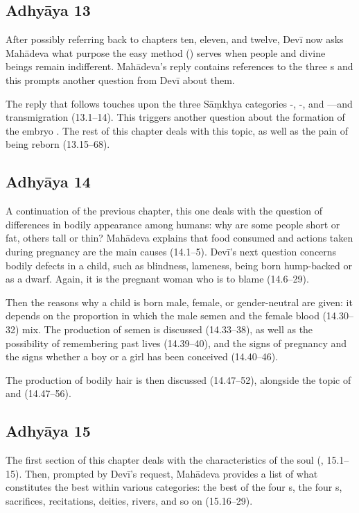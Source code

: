 \subsection*{Adhyāya 13}\label{contents_of_ch13}
After possibly referring back to chapters ten, eleven, and twelve, Devī now asks Mahādeva
what purpose the easy method () serves when people and divine beings remain indifferent.
Mahādeva's reply contains references to the three s and this prompts another question from Devī about them. 

The reply that follows touches upon the three Sāṃkhya categories -, -, and ---and
transmigration (13.1--14). This triggers another question about the formation of the embryo .
The rest of this chapter deals with this topic, as well as the pain of being reborn (13.15--68).

\subsection*{Adhyāya 14}\label{contents_of_ch14}
A continuation of the previous chapter, this one deals with the question of differences in bodily appearance 
among humans: why are some people short or fat, others tall or thin? Mahādeva explains that food consumed
and actions taken during pregnancy are the main causes (14.1--5). Devī's next question concerns bodily defects in 
a child, such as blindness, lameness, being born hump-backed or as a dwarf. Again, it is the pregnant woman who is
to blame (14.6--29). 

Then the reasons why a child is born male, female, or gender-neutral  are given:
it depends on the proportion in which the male semen and the female blood (14.30--32) mix.
The production of semen is discussed (14.33--38),
as well as the possibility of remembering past lives (14.39--40),
and the signs of pregnancy and the signs whether a boy or a girl has been conceived (14.40--46). 

The production of bodily hair is then discussed (14.47--52), alongside the topic of  and 
(14.47--56).

\subsection*{Adhyāya 15}\label{contents_of_ch15}
The first section of this chapter deals with the characteristics of the soul (, 15.1--15).
Then, prompted by Devī's request, Mahādeva provides a list of what constitutes the best within various categories:
the best of the four s, the four s, sacrifices, recitations,
deities, rivers, and so on (15.16--29).


